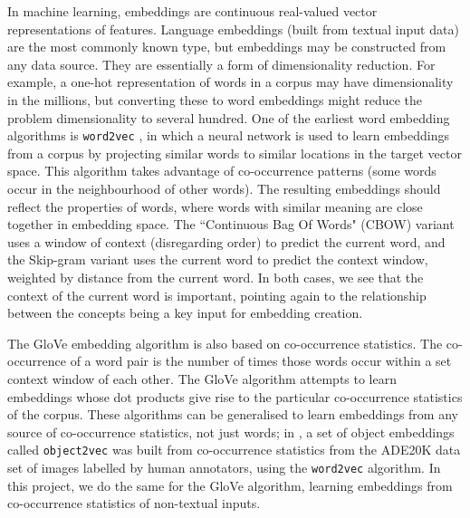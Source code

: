 In machine learning, embeddings are continuous real-valued vector representations of features. Language embeddings (built from textual input data) are the most commonly known type, but embeddings may be constructed from any data source. They are essentially a form of dimensionality reduction. For example, a one-hot representation of words in a corpus may have dimensionality in the millions, but converting these to word embeddings might reduce the problem dimensionality to several hundred. One of the earliest word embedding algorithms is \texttt{word2vec} \cite{word2vec}, in which a neural network is used to learn embeddings from a corpus by projecting similar words to similar locations in the target vector space. This algorithm takes advantage of co-occurrence patterns (some words occur in the neighbourhood of other words). The resulting embeddings should reflect the properties of words, where words with similar meaning are close together in embedding space. The ``Continuous Bag Of Words" (CBOW) variant uses a window of context (disregarding order) to predict the current word, and the Skip-gram variant uses the current word to predict the context window, weighted by distance from the current word. In both cases, we see that the context of the current word is important, pointing again to the relationship between the concepts being a key input for embedding creation. 

The GloVe \cite{pennington2014glove} embedding algorithm is also based on co-occurrence statistics. The co-occurrence of a word pair is the number of times those words occur within a set context window of each other. The GloVe algorithm attempts to learn embeddings whose dot products give rise to the particular co-occurrence statistics of the corpus. These algorithms can be generalised to learn embeddings from any source of co-occurrence statistics, not just words; in \cite{CoocurrenceVisionLanguage2021}, a set of object embeddings called \texttt{object2vec} was built from co-occurrence statistics from the ADE20K data set \cite{ADE20K} of images labelled by human annotators, using the \texttt{word2vec} algorithm. In this project, we do the same for the GloVe algorithm, learning embeddings from co-occurrence statistics of non-textual inputs. 



